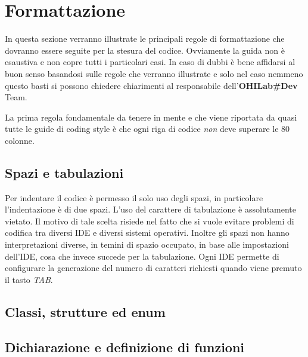 %
%

\section{Formattazione}\label{sec:formatting}

In questa sezione verranno illustrate le principali regole di formattazione che dovranno essere seguite per la stesura del codice.
Ovviamente la guida non è esaustiva e non copre tutti i particolari casi.
In caso di dubbi è bene affidarsi al buon senso basandosi sulle regole che verranno illustrate e solo nel caso nemmeno questo basti si possono chiedere chiarimenti al responsabile dell'\textbf{OHILab\#Dev} Team.

La prima regola fondamentale da tenere in mente e che viene riportata da quasi tutte le guide di coding style\cite{codestyle:google,codestyle:geotechnical,codestyle:quantum} è che ogni riga di codice \emph{non} deve superare le 80 colonne.

\subsection{Spazi e tabulazioni}

Per indentare il codice è permesso il solo uso degli spazi, in particolare l'indentazione è di due spazi.
L'uso del carattere di tabulazione è assolutamente vietato.
Il motivo di tale scelta risiede nel fatto che si vuole evitare problemi di codifica tra diversi IDE e diversi sistemi operativi.
Inoltre gli spazi non hanno interpretazioni diverse, in temini di spazio occupato, in base alle impostazioni dell'IDE, cosa che invece succede per la tabulazione.
Ogni IDE permette di configurare la generazione del numero di caratteri richiesti quando viene premuto il tasto \emph{TAB}.

\subsection{Classi, strutture ed enum}


\subsection{Dichiarazione e definizione di funzioni}

